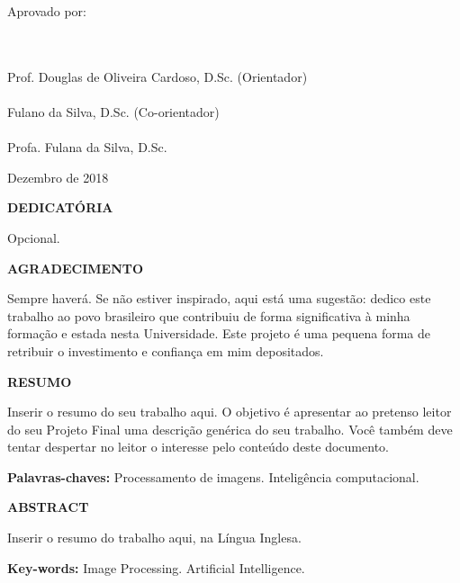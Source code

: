 {\begin{minipage}{0.9\textwidth}
	\begin{flushleft}
	Aprovado por:
	\end{flushleft}
\end{minipage}\\[1cm]

\center
\HRule \\
Prof. Douglas de Oliveira Cardoso, D.Sc. (Orientador) \\[1cm]
\HRule \\
Fulano da Silva, D.Sc. (Co-orientador)\\[1cm]
\HRule \\
Profa. Fulana da Silva, D.Sc.  \\[1.5cm]


\begin{center}
{Dezembro de 2018}
\end{center}


}



\newpage


\begin{center}
\textbf{\large DEDICATÓRIA}
\end{center}
      \vspace{0.5cm}

Opcional.
\newpage



\begin{center}
\textbf{\large  AGRADECIMENTO}
\end{center}
      \vspace{0.5cm}

Sempre haverá. Se não estiver inspirado, aqui está uma sugestão: dedico este trabalho ao povo brasileiro que contribuiu de forma significativa à minha formação e estada nesta Universidade. Este projeto é uma pequena forma de retribuir o investimento e confiança em mim depositados.
\newpage


\begin{center}
\textbf{\large RESUMO}
\end{center}
      \vspace{0.5cm}

Inserir o resumo do seu trabalho aqui. O objetivo é apresentar ao pretenso leitor do seu Projeto Final uma descrição genérica do seu trabalho. Você também deve tentar despertar no leitor o interesse pelo conteúdo deste documento.
\begin{flushleft}
{\bf Palavras-chaves:} Processamento de imagens. Inteligência computacional.
\end{flushleft}

\newpage

\begin{center}
\textbf{\large ABSTRACT}
\end{center}
\vspace{0.5cm}

Inserir o resumo do trabalho aqui, na Língua Inglesa.


\begin{flushleft}
{\bf Key-words:} Image Processing. Artificial Intelligence.
\end{flushleft}
